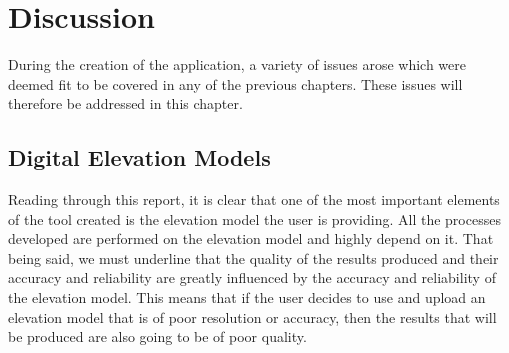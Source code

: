 
\chapter{Discussion} %

\label{ch:introduction} %


During the creation of the application, a variety of issues arose which were deemed fit to be covered in any of the previous chapters. These issues will therefore be addressed in this chapter.  


\section{Digital Elevation Models}
Reading through this report, it is clear that one of the most important elements of the tool created is the elevation model the user is providing. All the processes developed are performed on the elevation model and highly depend on it. 
That being said, we must underline that the quality of the results produced and their accuracy and reliability are greatly influenced by the accuracy and reliability of the elevation model. This means that if the user decides to use and upload an elevation model that is of poor resolution or accuracy, then the results that will be produced are also going to be of poor quality.\\

